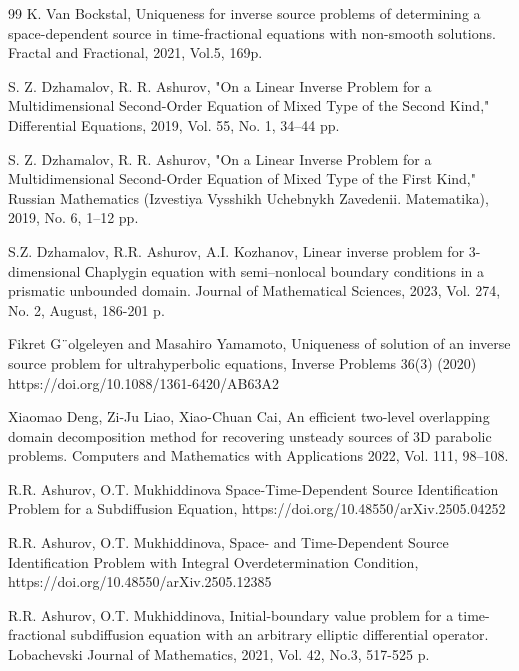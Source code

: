\documentclass[12pt]{amsart}
\theoremstyle{definition}
\numberwithin{equation}{section}
\begin{document}
\begin{thebibliography}{99}
 K. Van Bockstal, Uniqueness for inverse source problems of determining a space-dependent source in time-fractional equations with
non-smooth solutions. Fractal and Fractional, 2021, Vol.5, 169p.

 S. Z. Dzhamalov, R. R. Ashurov, "On a Linear Inverse Problem for a Multidimensional Second-Order Equation of Mixed Type of the Second Kind," Differential Equations, 2019, Vol. 55, No. 1,  34–44 pp.

 S. Z. Dzhamalov, R. R. Ashurov, "On a Linear Inverse Problem for a Multidimensional Second-Order Equation of Mixed Type of the First Kind," Russian Mathematics (Izvestiya Vysshikh Uchebnykh Zavedenii. Matematika), 2019, No. 6, 1–12 pp.



 S.Z. Dzhamalov, R.R. Ashurov, A.I. Kozhanov, Linear inverse problem for 3-dimensional Сhaplygin equation with semi–nonlocal boundary conditions in a prismatic unbounded domain. Journal of Mathematical Sciences, 2023, Vol. 274, No. 2, August, 186-201 p.





 Fikret G¨olgeleyen and Masahiro Yamamoto, Uniqueness of solution of an inverse source problem
for ultrahyperbolic equations, Inverse Problems 36(3) (2020) https://doi.org/10.1088/1361-6420/AB63A2

 Xiaomao Deng, Zi-Ju Liao, Xiao-Chuan Cai, An efficient two-level overlapping domain decomposition method for
recovering unsteady sources of 3D parabolic problems. Computers and Mathematics with Applications  2022, Vol. 111, 98–108.


 R.R. Ashurov, O.T. Mukhiddinova  Space-Time-Dependent Source Identification Problem for a Subdiffusion Equation, https://doi.org/10.48550/arXiv.2505.04252

 R.R. Ashurov, O.T. Mukhiddinova, Space- and Time-Dependent Source Identification Problem with Integral Overdetermination Condition, https://doi.org/10.48550/arXiv.2505.12385








 R.R. Ashurov,  O.T. Mukhiddinova, Initial-boundary value problem for a time-fractional subdiffusion
equation with an arbitrary elliptic differential operator. Lobachevski Journal of Mathematics, 2021, Vol. 42, No.3, 517-525 p.






\end{thebibliography}
\end{document}
